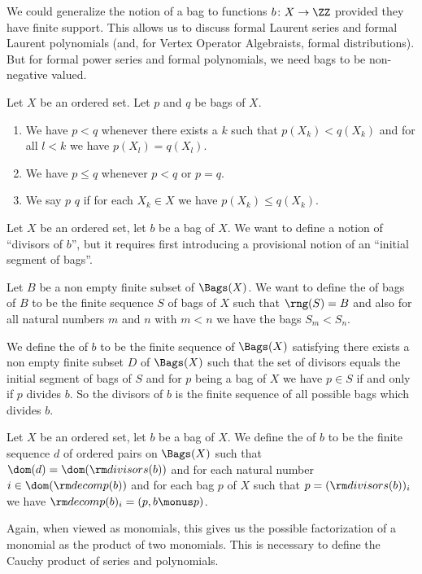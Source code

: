 \begin{remark}
We could generalize the notion of a bag to functions $b\colon X\to\ZZ$
provided they have finite support. This allows us to discuss formal
Laurent series and formal Laurent polynomials (and, for Vertex
Operator Algebraists, formal distributions). But for formal power
series and formal polynomials, we need bags to be non-negative valued.
\end{remark}

\begin{definition}
Let $X$ be an ordered set.
Let $p$ and $q$ be bags of $X$.
\begin{enumerate}
\item We have $p < q$ whenever there exists a $k$ such that
$p(X_{k})<q(X_{k})$ and for all $l<k$ we have $p(X_{l})=q(X_{l})$.
\item We have $p\leq q$ whenever $p<q$ or $p=q$.
\item We say $p$  $q$ if for each $X_{k}\in X$ we have
  $p(X_{k})\leq q(X_{k})$.
\end{enumerate}
\end{definition}

\begin{definition}
Let $X$ be an ordered set, let $b$ be a bag of $X$. We want to define
a notion of ``divisors of $b$'', but it requires first introducing a
provisional notion of an ``initial segment of bags''.

Let $B$ be a non empty finite subset of $\Bags(X)$.
We want to define the  of bags of $B$ to be
the finite sequence $S$ of bags of $X$ such that $\rng(S)=B$ and also
for all natural numbers $m$ and $n$ with $m < n$ we have the bags $S_{m}<S_{n}$.

We define the  of $b$ to be the finite sequence of
$\Bags(X)$ satisfying
there exists a non empty finite subset $D$ of $\Bags(X)$ such that
the set of divisors equals the initial segment of bags of $S$ and for
$p$ being a bag of $X$ we have $p\in S$ if and only if $p$ divides $b$.
So the divisors of $b$ is the finite sequence of all possible bags
which divides $b$.
\end{definition}

\begin{definition}
Let $X$ be an ordered set, let $b$ be a bag of $X$.
We define the  of $b$ to be the finite sequence $d$
of ordered pairs on $\Bags(X)$ such that
$\dom(d)=\dom({\rm divisors}(b))$ and
for each natural number $i\in\dom({\rm decomp}(b))$ and for each bag
$p$ of $X$ such that $p=({\rm divisors}(b))_{i}$ we have
${\rm decomp}(b)_{i} = (p, b \monus p)$.

Again, when viewed as monomials, this gives us the possible
factorization of a monomial as the product of two monomials. This is
necessary to define the Cauchy product of series and polynomials.
\end{definition}

